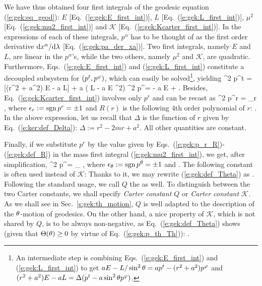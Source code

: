 We have thus obtained four first integrals of the geodesic equation
(\ref{e:gek:eq_geod}):
$E$ [Eq.~(\ref{e:gek:E_first_int})], $L$ [Eq.~(\ref{e:gek:L_first_int})],
$\mu^2$ [Eq.~(\ref{e:gek:mu2_first_int})] and $\mathscr{K}$
[Eq.~(\ref{e:gek:Kcarter_first_int})]. In the expressions of each of these integrals,
$p^\alpha$ has to be thought of as the first order derivative $\mathrm{d} x^\alpha/\mathrm{d}\lambda$
[Eq.~(\ref{e:gek:pa_der_xa})].
Two first integrals, namely $E$ and $L$, are linear in the $p^\alpha$'s, while
the two others, namely $\mu^2$ and $\mathscr{K}$, are quadratic.
Furthermore, Eqs.~(\ref{e:gek:E_first_int}) and (\ref{e:gek:L_first_int})
constitute a decoupled subsystem for $(p^t, p^\varphi)$, which can easily be solved\footnote{An
intermediate step is combining  Eqs.~(\ref{e:gek:E_first_int}) and (\ref{e:gek:L_first_int})
to get $a E - L /\sin^2\theta = a p^t - (r^2 + a^2) p^\varphi$
and $(r^2 + a^2) E - a L = \Delta(p^t - a\sin^2\theta p^\varphi)$.},
yielding
\be \label{e:gek:rho2_pt}
    \rho^2 p^t =  [(r^2 + a^2) E - a L] + a ( L - a E \sin^2\th )
\ee
\be  \label{e:gek:rho2_pph}
    \rho^2 p^\ph =  - a E
    + \left[(r^2 + a^2) E - a L\right] .
\ee
Besides, Eq.~(\ref{e:gek:Kcarter_first_int}) involves only $p^r$ and can
be recast as
\be \label{e:gek:p_r_R}
    \rho^2 p^r = \eps_r  ,
\ee
where $\epsilon_r := \operatorname{sgn} p^r = \pm 1$ and
$R(r)$ is the following 4th order polynomial of $r$:
\be \label{e:gek:def_R}
   .
\ee
In the above expression, let us recall that $\Delta$ is the function of $r$
given by Eq.~(\ref{e:ker:def_Delta}): $\Delta := r^2 - 2 m r + a^2$. All other
quantities are constant.

Finally, if we substitute $p^r$ by the value given by Eqs.~(\ref{e:gek:p_r_R})-(\ref{e:gek:def_R}) in the mass first integral (\ref{e:gek:mu2_first_int}), we get, after simplification,
\be \label{e:gek:p_th_Th}
    \rho^2 p^\th = \eps_\th \sqrt{\Theta(\th)} ,
\ee
where $\epsilon_\theta := \operatorname{sgn} p^\theta = \pm 1$ and
\be \label{e:gek:def_Theta}
    .
\ee
The following constant is often used instead of $\mathscr{K}$:
\be \label{e:gek:def_Q}
\ee
Thanks to it, we may rewrite (\ref{e:gek:def_Theta}) as
\be \label{e:gek:Theta_Q}
     .
\ee
Following the standard usage, we call $Q$ the 
as well. To distinguish between the two Carter constants, we shall specify \emph{Carter constant $Q$}
or \emph{Carter constant $\mathscr{K}$}. As we shall see in Sec.~\ref{s:gek:th_motion},
$Q$ is well adapted to the description of the $\theta$-motion of geodesics. On the other
hand, a nice property of $\mathscr{K}$, which is not shared by $Q$, is to be always non-negative,
as Eq.~(\ref{e:gek:def_Theta}) shows (given that $\Theta(\theta) \geq 0$ by virtue of
Eq.~(\ref{e:gek:p_th_Th})):
\be
      .
\ee

